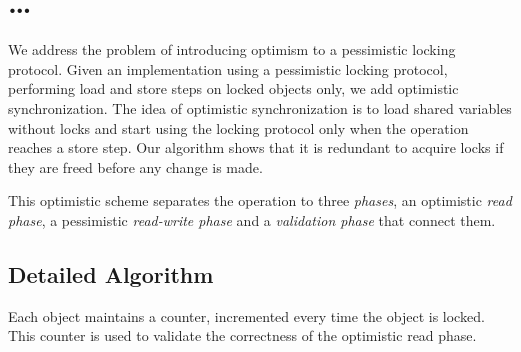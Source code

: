 \section{\ldots}
We address the problem of introducing 
optimism to a pessimistic locking protocol. 
Given an implementation using a 
pessimistic locking protocol, performing load and store steps 
on locked objects only, we add optimistic synchronization. 
The idea of optimistic synchronization is to load 
shared variables without locks and start using the 
locking protocol only when the operation reaches a store step.
Our algorithm shows that it is redundant to 
acquire locks if they are freed before any change is made.    

This optimistic scheme separates the operation to three
\emph{phases}, an optimistic \emph{read phase},
a pessimistic \emph{read-write phase} and a 
\emph{validation phase} that connect them. 

\subsection{Detailed Algorithm}
Each object maintains a counter, incremented every time the 
object is locked. This counter is used to validate the correctness
of the optimistic read phase. 

